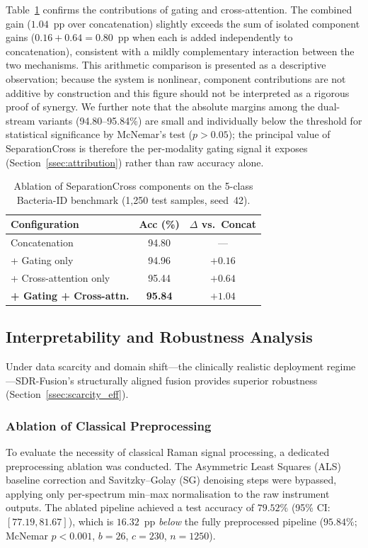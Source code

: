 \documentclass[preprint,12pt]{elsarticle}
\begin{document}
Table~\ref{tab:fusion_ablation} confirms the contributions of gating
and cross-attention. The combined gain ($1.04$~pp over concatenation)
slightly exceeds the sum of isolated component gains
($0.16+0.64=0.80$~pp when each is added independently to
concatenation), consistent with a mildly complementary interaction
between the two mechanisms. This arithmetic comparison is presented as
a descriptive observation; because the system is nonlinear, component
contributions are not additive by construction and this figure should
not be interpreted as a rigorous proof of synergy. We further note
that the absolute margins among the dual-stream variants (94.80--95.84\%)
are small and individually below the threshold for statistical
significance by McNemar's test ($p>0.05$); the principal value of
SeparationCross is therefore the per-modality gating signal it exposes
(Section~\ref{ssec:attribution}) rather than raw accuracy alone.

\begin{table}[!t]
\centering
\caption{Ablation of SeparationCross components on the 5-class Bacteria-ID benchmark (1,250 test samples, seed~42).}
\label{tab:fusion_ablation}
\begin{tabular}{lcc}
  \toprule
  Configuration & Acc (\%) & $\Delta$ vs.\ Concat \\
  \midrule
  Concatenation                   & 94.80 & --- \\
  + Gating only                   & 94.96 & $+0.16$ \\
  + Cross-attention only          & 95.44 & $+0.64$ \\
  \textbf{+ Gating + Cross-attn.} & \textbf{95.84} & $\mathbf{+1.04}$ \\
  \bottomrule
\end{tabular}
\end{table}

\subsection{Interpretability and Robustness Analysis}
\label{ssec:interp_robust}
Under data scarcity and domain shift---the clinically realistic
deployment regime---SDR-Fusion's structurally aligned fusion provides
superior robustness (Section~\ref{ssec:scarcity_eff}).

\subsubsection{Ablation of Classical Preprocessing}
\label{sssec:preproc_ablation}
To evaluate the necessity of classical Raman signal processing, a
dedicated preprocessing ablation was conducted. The Asymmetric Least
Squares (ALS) baseline correction and Savitzky--Golay (SG) denoising
steps were bypassed, applying only per-spectrum min--max normalisation
to the raw instrument outputs. The ablated pipeline achieved a test
accuracy of $79.52\%$ (95\% CI: $[77.19, 81.67]$), which is
$16.32$~pp \emph{below} the fully preprocessed pipeline ($95.84\%$;
McNemar $p{<}0.001$, $b{=}26$, $c{=}230$, $n{=}1250$).
\end{document}
